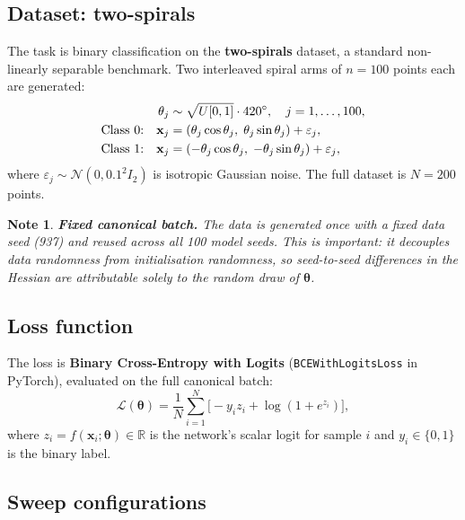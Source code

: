 \documentclass[12pt,a4paper]{article}
\newtheorem{note}{Note}
\newcommand{\R}{\mathbb{R}}
\newcommand{\btheta}{\boldsymbol{\theta}}
\newcommand{\bx}{\mathbf{x}}
\begin{document}
\subsection{Dataset: two-spirals}
\label{ssec:data}

The task is binary classification on the \textbf{two-spirals} dataset,
a standard non-linearly separable benchmark.
Two interleaved spiral arms of $n=100$ points each are generated:
\begin{align}
  \theta_j &\sim \sqrt{U[0,1]} \cdot 420^\circ, \quad j=1,\ldots,100, \notag\\
  \text{Class 0:}\quad
    \bx_j &= (\theta_j \cos\theta_j,\; \theta_j \sin\theta_j)
             + \varepsilon_j, \notag\\
  \text{Class 1:}\quad
    \bx_j &= (-\theta_j \cos\theta_j,\; -\theta_j \sin\theta_j)
             + \varepsilon_j, \notag
\end{align}
where $\varepsilon_j \sim \mathcal{N}(0, 0.1^2 I_2)$ is isotropic Gaussian
noise.  The full dataset is $N = 200$ points.

\begin{note}
\textbf{Fixed canonical batch.}
The data is generated \emph{once} with a fixed data seed (937) and
reused across all 100 model seeds. This is important: it decouples
data randomness from initialisation randomness, so seed-to-seed differences in the Hessian are attributable solely to the random draw of $\btheta$.
\end{note}

\subsection{Loss function}
\label{ssec:loss}

The loss is \textbf{Binary Cross-Entropy with Logits}
(\texttt{BCEWithLogitsLoss} in PyTorch), evaluated on the full canonical batch:
\begin{equation}
  \mathcal{L}(\btheta)
  = \frac{1}{N} \sum_{i=1}^{N}
    \bigl[ -y_i z_i + \log(1 + e^{z_i}) \bigr],
  \label{eq:bce}
\end{equation}
where $z_i = f(\bx_i; \btheta) \in \R$ is the network's scalar logit for
sample $i$ and $y_i \in \{0,1\}$ is the binary label.

\subsection{Sweep configurations}
\label{ssec:sweep}
\end{document}
